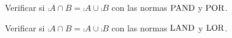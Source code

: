 Verificar si \(\comp{A ∩ B} = \comp{A} ∪ \comp{B}\)
con las normas \(\operatorname{PAND}\) y \(\operatorname{POR}\).

Verificar si \(\comp{A ∩ B} = \comp{A} ∪\comp{B}\)
con las normas \(\operatorname{LAND}\) y \(\operatorname{LOR}\).

